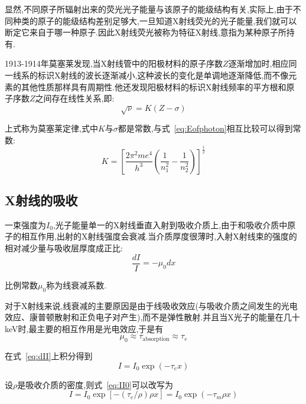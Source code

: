 \documentclass[a4paper]{article}
\begin{document}
显然,不同原子所辐射出来的荧光光子能量与该原子的能级结构有关,实际上,由于不同种类的原子的能级结构差别足够大,一旦知道X射线荧光的光子能量,我们就可以断定它来自于哪一种原子.因此X射线荧光被称为特征X射线,意指为某种原子所持有.

1913-1914年莫塞莱发现,当X射线管中的阳极材料的原子序数$Z$逐渐增加时,相应同一线系的标识X射线的波长逐渐减小,这种波长的变化是单调地逐渐降低,而不像元素的其他性质那样具有周期性.他还发现阳极材料的标识X射线频率的平方根和原子序数$Z$之间存在线性关系,即:
\begin{equation}
    \label{eq:law}
    \sqrt{\nu} = K(Z - \sigma)
\end{equation}

上式称为莫塞莱定律,式中$K$与$\sigma$都是常数,与式~\ref{eq:Eofphoton}相互比较可以得到常数:
\begin{equation}
    K = \left[\frac{2\pi^2me^4}{h^3}\left(\frac{1}{n_1^2} -
            \frac{1}{n_2^2}\right)\right]^{\frac{1}{2}}
\end{equation}

\subsection{X射线的吸收}

一束强度为$I_0$,光子能量单一的X射线垂直入射到吸收介质上,由于和吸收介质中原子的相互作用,出射的X射线强度会衰减.当介质厚度很薄时,入射X射线束的强度的相对减少量与吸收层厚度成正比:
\begin{equation}
    \label{eq:dII}
    \frac{dI}{I} = - \mu_0 dx
\end{equation}

比例常数$\mu_0$称为线衰减系数.

对于X射线来说,线衰减的主要原因是由于线吸收效应(与吸收介质之间发生的光电效应、康普顿散射和正负电子对产生),而不是弹性散射.并且当X光子的能量在几十\si{keV}时,最主要的相互作用是光电效应,于是有
\begin{equation}
    \mu_0 \approx \tau_{\text{absorption}} \approx \tau_e
\end{equation}

在式~\ref{eq:dII}上积分得到
\begin{equation}
    \label{eq:II0}
    I = I_0 \exp( - \tau_e x)
\end{equation}

设$\rho$是吸收介质的密度,则式~\ref{eq:II0}可以改写为
\begin{equation}
    I = I_0\exp[-(\tau_e/\rho)\rho x] = I_0\exp(-\tau_m\rho x)
\end{equation}
\end{document}

